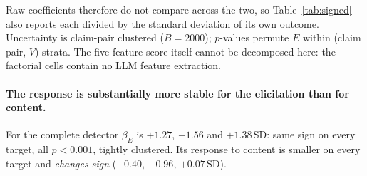 Raw coefficients therefore do not compare across the two, so Table~\ref{tab:signed} also reports each divided by the standard deviation of its own outcome. Uncertainty is claim-pair clustered ($B\!=\!2000$); $p$-values permute $E$ within (claim pair, $V$) strata. The five-feature score itself cannot be decomposed here: the factorial cells contain no LLM feature extraction.

\begin{table}[t]
\centering
\small
\caption{Signed effects, raw and standardized (\,$\beta/\mathrm{SD}(Y)$, which makes the panels comparable\,). On the common scale the \textbf{complete detector's} elicitation response is both large and tightly consistent ($+1.27$ to $+1.56$\,SD) while its content response changes sign; the single feature's elicitation response is smaller and itself sign-unstable. Both panels are OLS; claim-pair clustered CIs, $B\!=\!2000$.}
\label{tab:signed}
\end{table}

\paragraph{The response is substantially more stable for the elicitation than for content.} For the complete detector $\beta_E$ is $+1.27$, $+1.56$ and $+1.38$\,SD: same sign on every target, all $p\!<\!0.001$, tightly clustered. Its response to content is smaller on every target and \emph{changes sign} ($-0.40$, $-0.96$, $+0.07$\,SD).

